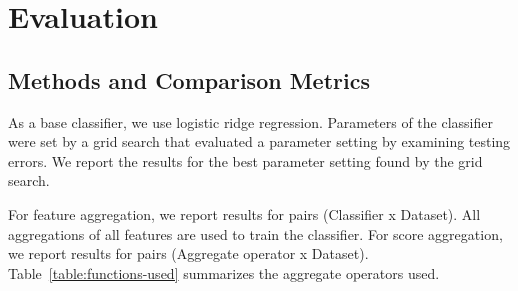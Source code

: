 \documentclass[conference]{IEEEtran}
\begin{document}
%
%
%
%
%
\section{Evaluation}


\subsection{Methods and Comparison Metrics} %
As a base classifier, we use logistic ridge regression. Parameters of the classifier were set by a grid search that evaluated a parameter setting by examining testing errors. We report the results for the best parameter setting found by the grid search.

For feature aggregation, we report results for pairs (Classifier x Dataset). All aggregations of all features are used to train the classifier. For score aggregation, we report results for pairs (Aggregate operator x Dataset). Table~\ref{table:functions-used} summarizes the aggregate operators used.
\end{document}
